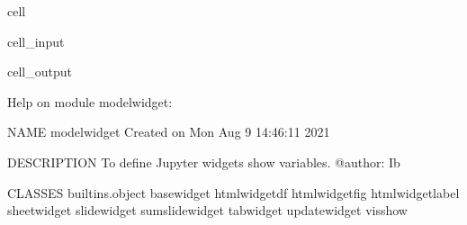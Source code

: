 \documentclass[letterpaper,10pt,english]{jupyterBook}
\begin{document}
\begin{sphinxuseclass}{cell}\begin{sphinxVerbatimInput}

\begin{sphinxuseclass}{cell_input}
\begin{sphinxVerbatim}[commandchars=\\\{\}]

\end{sphinxVerbatim}

\end{sphinxuseclass}\end{sphinxVerbatimInput}
\begin{sphinxVerbatimOutput}

\begin{sphinxuseclass}{cell_output}
\begin{sphinxVerbatim}[commandchars=\\\{\}]
Help on module modelwidget:

NAME
    modelwidget \PYGZhy{} Created on Mon Aug  9 14:46:11 2021

DESCRIPTION
    To define Jupyter widgets  show variables. 
    @author: Ib

CLASSES
    builtins.object
        basewidget
        htmlwidget\PYGZus{}df
        htmlwidget\PYGZus{}fig
        htmlwidget\PYGZus{}label
        sheetwidget
        slidewidget
        sumslidewidget
        tabwidget
        updatewidget
        visshow
    

\end{sphinxVerbatim}
\end{sphinxuseclass}
\end{sphinxVerbatimOutput}
\end{sphinxuseclass}
\end{document}
